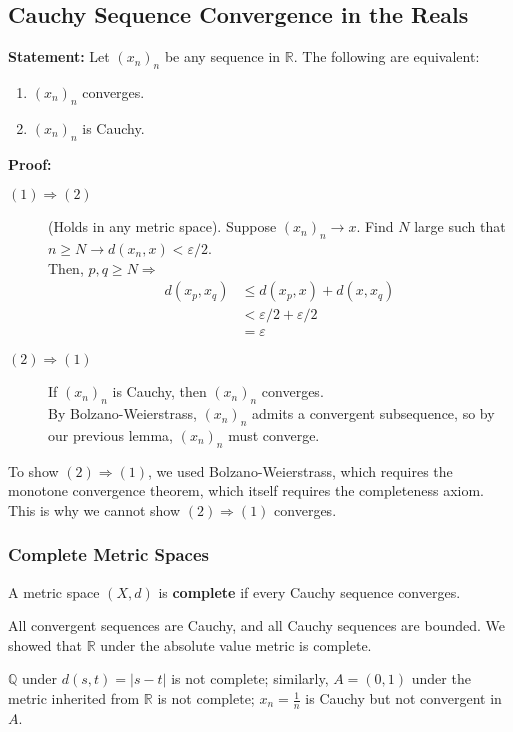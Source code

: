 \documentclass[10pt]{extarticle}
\newcommand{\Q}{\mathbb{Q}}
\newcommand{\R}{\mathbb{R}}
\begin{document}
  \subsection{Cauchy Sequence Convergence in the Reals}%
    \textbf{Statement:} Let $(x_n)_n$ be any sequence in $\R$. The following are equivalent:
    \begin{enumerate}[(1)]
      \item $(x_n)_n$ converges.
      \item $(x_n)_n$ is Cauchy.
    \end{enumerate}
    \textbf{Proof:}
    \begin{description}
      \item[$(1) \Rightarrow (2)$] (Holds in any metric space). Suppose $(x_n)_n \rightarrow x$. Find $N$ large such that $n\geq N \rightarrow d(x_n,x) < \varepsilon/2$.\\

        Then, $p,q\geq N \Rightarrow$
        \begin{align*}
          d(x_p,x_q) &\leq d(x_p,x) + d(x,x_q)\\
                     &< \varepsilon/2 + \varepsilon/2\\
                     &= \varepsilon
        \end{align*}
      \item[$(2)\Rightarrow(1)$] If $(x_n)_n$ is Cauchy, then $(x_n)_n$ converges.\\

        By Bolzano-Weierstrass, $(x_n)_n$ admits a convergent subsequence, so by our previous lemma, $(x_n)_n$ must converge.
    \end{description}
    \begin{description}
      \small
      \item[Note:] To show $(2) \Rightarrow (1)$, we used Bolzano-Weierstrass, which requires the monotone convergence theorem, which itself requires the completeness axiom. This is why we cannot show $(2) \Rightarrow (1)$ converges.
    \end{description}
  \subsubsection{Complete Metric Spaces}%
    A metric space $(X,d)$ is \textbf{complete} if every Cauchy sequence converges.
    \begin{description}
      \small
      \item[Remark:] All convergent sequences are Cauchy, and all Cauchy sequences are bounded. We showed that $\R$ under the absolute value metric is complete.
    \end{description}
    $\Q$ under $d(s,t) = |s-t|$ is not complete; similarly, $A = (0,1)$ under the metric inherited from $\R$ is not complete; $x_n = \frac{1}{n}$ is Cauchy but not convergent in $A$.
\end{document}
